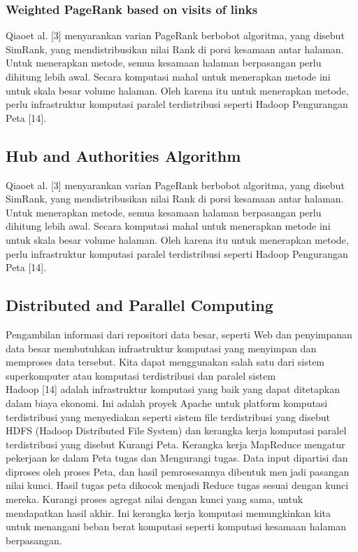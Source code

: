 \documentclass[conference]{IEEEtran}
\begin{document}
\subsubsection{Weighted PageRank based on visits of links}
Qiaoet al. [3] menyarankan varian PageRank berbobot
algoritma, yang disebut SimRank, yang mendistribusikan nilai
Rank di porsi kesamaan antar halaman. Untuk menerapkan
metode, semua kesamaan halaman berpasangan perlu dihitung
lebih awal. Secara komputasi mahal untuk menerapkan
metode ini untuk skala besar volume halaman. Oleh karena
itu untuk menerapkan metode, perlu infrastruktur komputasi
paralel terdistribusi seperti Hadoop Pengurangan Peta [14].

\subsection{Hub and Authorities Algorithm }
Qiaoet al. [3] menyarankan varian PageRank berbobot
algoritma, yang disebut SimRank, yang mendistribusikan nilai
Rank di porsi kesamaan antar halaman. Untuk menerapkan
metode, semua kesamaan halaman berpasangan perlu dihitung
lebih awal. Secara komputasi mahal untuk menerapkan
metode ini untuk skala besar volume halaman. Oleh karena
itu untuk menerapkan metode, perlu infrastruktur komputasi
paralel terdistribusi seperti Hadoop Pengurangan Peta [14].

\subsection{Distributed and Parallel Computing }
Pengambilan informasi dari repositori data besar, seperti
Web dan penyimpanan data besar membutuhkan infrastruktur
komputasi yang menyimpan dan memproses data tersebut.
Kita dapat menggunakan salah satu dari sistem superkomputer
atau komputasi terdistribusi dan paralel sistem\\

Hadoop [14] adalah infrastruktur komputasi yang baik
yang dapat ditetapkan dalam biaya ekonomi. Ini adalah
proyek Apache untuk platform komputasi terdistribusi yang
menyediakan seperti sistem file terdistribusi yang disebut
HDFS (Hadoop Distributed File System) dan kerangka kerja
komputasi paralel terdistribusi yang disebut Kurangi Peta.
Kerangka kerja MapReduce mengatur pekerjaan ke dalam Peta
tugas dan Mengurangi tugas. Data input dipartisi dan diproses
oleh proses Peta, dan hasil pemrosesannya dibentuk menjadi pasangan nilai kunci. Hasil tugas peta dikocok menjadi
Reduce tugas sesuai dengan kunci mereka. Kurangi proses
agregat nilai dengan kunci yang sama, untuk mendapatkan
hasil akhir. Ini kerangka kerja komputasi memungkinkan kita
untuk menangani beban berat komputasi seperti komputasi
kesamaan halaman berpasangan.
\end{document}
